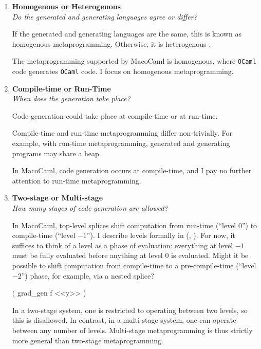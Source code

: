 \begin{enumerate}
  \item \textbf{\textsf{Homogenous or Heterogenous}}\\
         \textit{Do the generated and generating languages agree or differ?}
  
        If the generated and generating languages are the same, this is known as {homogenous} metaprogramming. Otherwise, it is {heterogenous} \citep{kiselyov-2024}.

        The metaprogramming supported by MacoCaml is homogenous, where \texttt{OCaml} code generates \texttt{OCaml} code. I focus on homogenous metaprogramming.

  \item \textbf{\textsf{Compile-time or Run-Time}} \\
        \textit{When does the generation take place?}

        Code generation could take place at compile-time or at run-time.

        
        Compile-time and run-time metaprogramming differ non-trivially. For example, with run-time metaprogramming, generated and generating programs may share a heap. 

        In MacoCaml, code generation occurs at compile-time, and I pay no further attention to run-time metaprogramming.
        
  \item \textbf{\textsf{Two-stage or Multi-stage}} \\
  \textit{How many stages of code generation are allowed?}

  In MacoCaml, top-level splices shift computation from run-time (``level $0$'') to compile-time (``level $-1$''). I describe levels formally in  (, ). For now, it suffices to think of a level as a phase of evaluation: everything at level $-1$ must be fully evaluated before anything at level $0$ is evaluated. Might it be possible to shift computation from compile-time to a pre-compile-time (``level $-2$'') phase, for example, via a nested splice?
  \begin{macocaml}
$($ grad_gen f <<y>> )
  \end{macocaml}
  In a two-stage system, one is restricted to operating between two levels, so this is disallowed. In contrast, in a multi-stage system, one can operate between any number of levels. Multi-stage metaprogramming is thus strictly more general than two-stage metaprogramming.
  

\end{enumerate}
